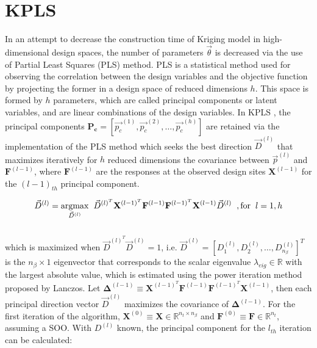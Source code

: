 \section{KPLS}  
In an attempt to decrease the construction time of Kriging
model in high-dimensional design spaces, the number of 
parameters $\vec{θ}$ is decreased via the use of Partial 
Least Squares (PLS) method\cite{PLS}. PLS is a 
statistical method used for observing the correlation 
between the design variables and the objective function 
by projecting the former in a design space of reduced 
dimensions $h$. This space is formed by $h$ parameters, 
which are called principal components or latent variables, 
and are linear combinations of the design variables. In KPLS 
\cite{KPLS}, the principal components $\mathbf{P_{c}} = 
[\vec{p_{c}}^{(1)}, \vec{p_{c}}^{(2)}, \hdots, \vec{p_{c}}^{(h)}]$ 
are retained via the implementation of the PLS method which seeks 
the best direction $\vec{D}^{(l)}$ that maximizes iteratively 
for $h$ reduced dimensions the covariance between 
$\vec{p}^{(l)}$ and $\mathbf{F}^{(l-1)}$, where $\mathbf{F}
^{(l-1)}$ are the responses at the observed design sites 
$\mathbf{X}^{(l-1)}$ for the $(l-1)_{th}$ principal component.

	\begin{equation}
	\vec{D}^{(l)} = 
	\underset{\vec{D}^{(l)}}{\mathrm{argmax}} 	
	\hspace{2mm}
	\vec{D}^{(l)^T} \mathbf{X}^{(l-1)^{T}} \mathbf{F}
	^{(l-1)} \mathbf{F}^{(l-1)^{T}} \mathbf{X}^{(l-1)} 
	\vec{D}^{(l)}  
	\hspace{2mm}, \text{for} \hspace{2mm} l=1,h
	\end{equation}
\\[-2mm]
which is maximized when $\vec{D}^{(l)^{T}} \vec{D}^{(l)} = 1$, i.e.
$\vec{D}^{(l)} = [D_{1}^{(l)}, D_{2}^{(l)}, \hdots, D_{n_{β}}
^{(l)}]^T$ is the $n_{β} \times 1$ eigenvector that corresponds 
to the scalar eigenvalue $λ_{eig} \in \mathbb{R}$ with the largest 
absolute value, which is estimated using the power iteration 
method proposed by Lanczos\cite{power_iter}. Let $\bm{Δ}^{(l-1)} 
\equiv \mathbf{X}^{(l-1)^{T}} \mathbf{F}^{(l-1)} \mathbf{F}
^{(l-1)^{T}} \mathbf{X}^{(l-1)}$, then each principal direction 
vector $\vec{D}^{(l)}$ maximizes the covariance of 
$\bm{Δ}^{(l-1)}$. For the first iteration of the algorithm, 
$\mathbf{X}^{(0)} \!\equiv \!\mathbf{X} \!\in \!\mathbb{R}^{n_{t} 
\times n_{β}}$ and $\mathbf{F}^{(0)} \!\equiv \!\mathbf{F} \!\in \!
\mathbb{R}^{n_{t}}$, assuming a SOO. With $D^{(l)}$ known, the 
principal component for the $l_{th}$ iteration can be calculated:

